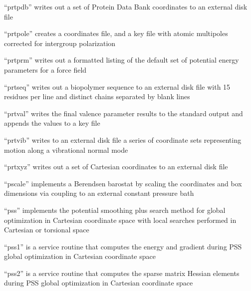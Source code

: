 \documentclass[letterpaper,11pt,english]{sphinxmanual}
\begin{document}
“prtpdb” writes out a set of Protein Data Bank coordinates
to an external disk file


“prtpole” creates a coordinates file, and a key file with
atomic multipoles corrected for intergroup polarization


“prtprm” writes out a formatted listing of the default
set of potential energy parameters for a force field


“prtseq” writes out a biopolymer sequence to an external
disk file with 15 residues per line and distinct chains
separated by blank lines


“prtval” writes the final valence parameter results to the
standard output and appends the values to a key file


“prtvib” writes to an external disk file a series of
coordinate sets representing motion along a vibrational
normal mode


“prtxyz” writes out a set of Cartesian coordinates
to an external disk file


“pscale” implements a Berendsen barostat by scaling the
coordinates and box dimensions via coupling to an external
constant pressure bath


“pss” implements the potential smoothing plus search method
for global optimization in Cartesian coordinate space with
local searches performed in Cartesian or torsional space


“pss1” is a service routine that computes the energy
and gradient during PSS global optimization in Cartesian
coordinate space


“pss2” is a service routine that computes the sparse
matrix Hessian elements during PSS global optimization
in Cartesian coordinate space

\end{document}
